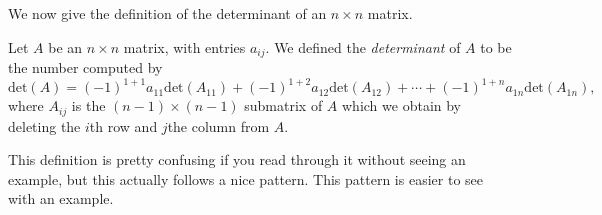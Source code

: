 \documentclass{ximera}
\begin{document}
We now give the definition of the determinant of an $n\times n$ matrix.

\begin{definition}
Let $A$ be an $n\times n$ matrix, with entries $a_{ij}$. We defined the \emph{determinant} of $A$ to be the number computed by
\[
\textrm{det}(A) = (-1)^{1+1}a_{11}\textrm{det}(A_{11}) + (-1)^{1+2}a_{12}\textrm{det}(A_{12}) + \cdots + (-1)^{1+n}a_{1n}\textrm{det}(A_{1n}),
\]
where $A_{ij}$ is the $(n-1)\times (n-1)$ submatrix of $A$ which we obtain by deleting the $i$th row and $j$the column from $A$.
\end{definition}

This definition is pretty confusing if you read through it without seeing an example, but this actually follows a nice pattern. This pattern is easier to see with an example.
\end{document}
